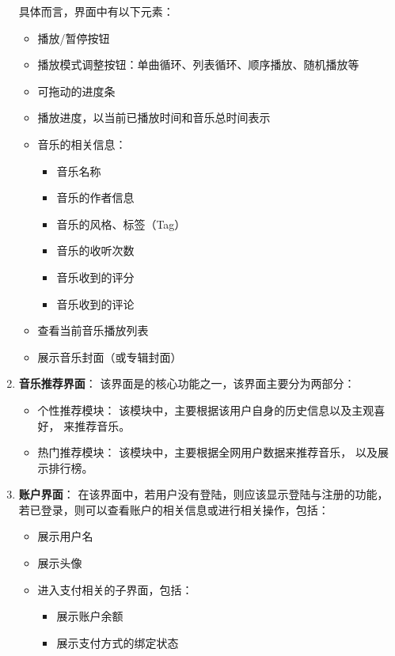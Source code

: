 \begin{enumerate}
        具体而言，界面中有以下元素：
        \begin{itemize}
            \item 播放/暂停按钮
            \item 播放模式调整按钮：单曲循环、列表循环、顺序播放、随机播放等
            \item 可拖动的进度条
            \item 播放进度，以当前已播放时间和音乐总时间表示
            \item 音乐的相关信息：
            \begin{itemize}
                \item 音乐名称
                \item 音乐的作者信息
                \item 音乐的风格、标签（Tag）
                \item 音乐的收听次数
                \item 音乐收到的评分
                \item 音乐收到的评论
            \end{itemize}
            \item 查看当前音乐播放列表
            \item 展示音乐封面（或专辑封面）
        \end{itemize}
    \item \textbf{音乐推荐界面}：
        该界面是\proname 的核心功能之一，该界面主要分为两部分：
        \begin{itemize}
            \item 个性推荐模块：
                该模块中，主要根据该用户自身的历史信息以及主观喜好，
                来推荐音乐。
            \item 热门推荐模块：
                该模块中，主要根据全网用户数据来推荐音乐，
                以及展示排行榜。
        \end{itemize}
    \item \textbf{账户界面}：
        在该界面中，若用户没有登陆，则应该显示登陆与注册的功能，
        若已登录，则可以查看账户的相关信息或进行相关操作，包括：
        \begin{itemize}
            \item 展示用户名
            \item 展示头像
            \item 进入支付相关的子界面，包括：
            \begin{itemize}
                \item 展示账户余额
                \item 展示支付方式的绑定状态

\end{itemize}
\end{itemize}
\end{enumerate}
